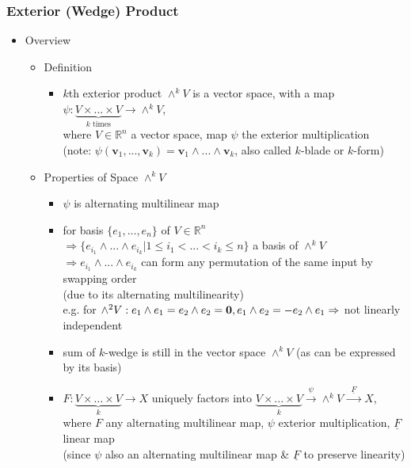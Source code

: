 \subsubsection{Exterior (Wedge) Product}
\begin{itemize}
\item Overview
	\begin{itemize}
	\item Definition
		\begin{itemize}
		\item $k$th exterior product $\wedge^kV$ is a vector space, with a map $\psi:\underbrace{V\times...\times V}_{k \text{ times}} \rightarrow \wedge^kV$, \\
		where $V\in \mathbb R^n$ a vector space, map $\psi$ the exterior multiplication \\ 
		(note: $\psi(\mathbf v_1,...,\mathbf v_k) = \mathbf v_1\wedge...\wedge\mathbf v_k$, also called $k$-blade or $k$-form)
		\end{itemize}
	\item Properties of Space $\wedge^kV$
		\begin{itemize}
		\item $\psi$ is alternating multilinear map
		\item for basis $\{e_1,...,e_n\}$ of $V\in\mathbb R^n$ \\ 
		$\Rightarrow \{e_{i_1}\wedge ...\wedge e_{i_k}|1\leq i_1 <...< i_k \leq n\}$ a basis of $\wedge^kV$ \\
		$\Rightarrow e_{i_1}\wedge ...\wedge e_{i_k}$ can form any permutation of the same input by swapping order \\
		(due to its alternating multilinearity) \\
		e.g. for $\wedge^2V: e_1\wedge e_1 = e_2\wedge e_2=\mathbf 0,\space e_1\wedge e_2=-e_2\wedge e_1 \Rightarrow$ not linearly independent
		\item sum of $k$-wedge is still in the vector space $\wedge^k V$ (as can be expressed by its basis)
		\item $F:\underbrace{V\times...\times V}_k\rightarrow X$ uniquely factors into $\underbrace{V\times...\times V}_k\xrightarrow{\psi} \wedge^k V \xrightarrow{\text{ }\underline F\text{ }} X$, \\ 
		where $F$ any alternating multilinear map, $\psi$ exterior multiplication, $\underline F$ linear map \\
		(since $\psi$ also an alternating multilinear map \& $\underline F$ to preserve linearity)
		\end{itemize}

\end{itemize}
\end{itemize}
